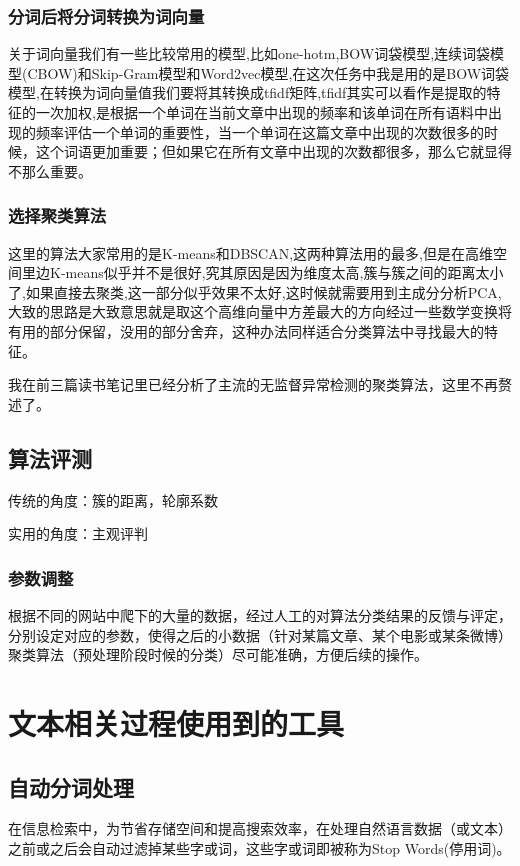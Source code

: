 \documentclass[UTF8]{ctexart}
\begin{document}
\subsubsection{分词后将分词转换为词向量}
关于词向量我们有一些比较常用的模型,比如one-hotm,BOW词袋模型,连续词袋模型(CBOW)和Skip-Gram模型和Word2vec模型,在这次任务中我是用的是BOW词袋模型,在转换为词向量值我们要将其转换成tfidf矩阵,tfidf其实可以看作是提取的特征的一次加权,是根据一个单词在当前文章中出现的频率和该单词在所有语料中出现的频率评估一个单词的重要性，当一个单词在这篇文章中出现的次数很多的时候，这个词语更加重要；但如果它在所有文章中出现的次数都很多，那么它就显得不那么重要。\cite{zhihu1}

\subsubsection{选择聚类算法}
这里的算法大家常用的是K-means和DBSCAN,这两种算法用的最多,但是在高维空间里边K-means似乎并不是很好,究其原因是因为维度太高,簇与簇之间的距离太小了,如果直接去聚类,这一部分似乎效果不太好,这时候就需要用到主成分分析PCA,大致的思路是大致意思就是取这个高维向量中方差最大的方向经过一些数学变换将有用的部分保留，没用的部分舍弃，这种办法同样适合分类算法中寻找最大的特征。\cite{zhihu1}

我在前三篇读书笔记里已经分析了主流的无监督异常检测的聚类算法，这里不再赘述了。

\subsection{算法评测}
传统的角度：簇的距离，轮廓系数

实用的角度：主观评判

\subsubsection{参数调整}
根据不同的网站中爬下的大量的数据，经过人工的对算法分类结果的反馈与评定，分别设定对应的参数，使得之后的小数据（针对某篇文章、某个电影或某条微博）聚类算法（预处理阶段时候的分类）尽可能准确，方便后续的操作。

\section{文本相关过程使用到的工具}
\subsection{自动分词处理}
在信息检索中，为节省存储空间和提高搜索效率，在处理自然语言数据（或文本）之前或之后会自动过滤掉某些字或词，这些字或词即被称为Stop Words(停用词)。
\end{document}
